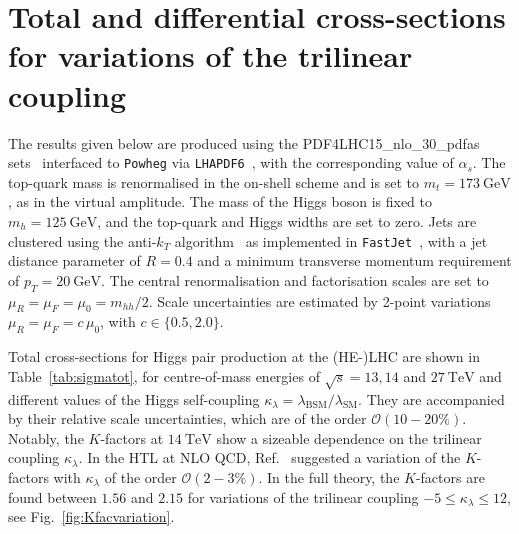 \documentclass[a4paper]{jpconf}
\newcommand{\GeV}{\ensuremath{\mathrm{\:GeV}}}
\newcommand{\TeV}{\ensuremath{\mathrm{\:TeV}}}
\newcommand{\chhh}{\ensuremath{\kappa_{\lambda}}}
\begin{document}



\section{Total and differential cross-sections for variations of the trilinear coupling}

The results given below are produced using the PDF4LHC15\_nlo\_30\_pdfas sets~\cite{Butterworth:2015oua,CT14,MMHT14,NNPDF} interfaced to \texttt{Powheg} via \texttt{LHAPDF6}~\cite{Buckley:2014ana}, with the corresponding value of $\alpha_s$. The top-quark mass is renormalised in the on-shell scheme and is set to $m_t=173 \GeV$, as in the virtual amplitude. The mass of the Higgs boson is fixed to $m_h=125 \GeV$, and the top-quark and Higgs widths are set to zero. Jets are clustered using the anti-$k_T$ algorithm~\cite{Cacciari:2008gp} as implemented in \texttt{FastJet}~\cite{Cacciari:2005hq, Cacciari:2011ma}, with a jet distance parameter of $R=0.4$ and a minimum transverse momentum requirement of $p_{T} = 20 \GeV$. The central renormalisation and factorisation scales are set to $\mu_R = \mu_F = \mu_0 = m_{hh} / 2$. Scale uncertainties are estimated by 2-point variations $\mu_R = \mu_F = c\, \mu_0$, with $c \in \lbrace {0.5, 2.0} \rbrace$.

Total cross-sections for Higgs pair production at the (HE-)LHC are shown in Table~\ref{tab:sigmatot}, for centre-of-mass energies of $\sqrt{s}=13,14$ and $27 \TeV$ and different values of the Higgs self-coupling $\chhh = \lambda_{\mathrm{BSM}} / \lambda_{\mathrm{SM}}$. They are accompanied by their relative scale uncertainties, which are of the order $\mathcal{O}(10-20\%)$. Notably, the $K$-factors at $14 \TeV$ show a sizeable dependence on the trilinear coupling $\chhh$. In the HTL at NLO QCD, Ref.~\cite{Grober:2015cwa} suggested a variation of the $K$-factors with $\chhh$ of the order $\mathcal{O}(2-3\%)$. In the full theory, the $K$-factors are found between $1.56$ and $2.15$ for variations of the trilinear coupling $-5 \leq \chhh \leq 12$, see Fig.~\ref{fig:Kfacvariation}. 
\end{document}
